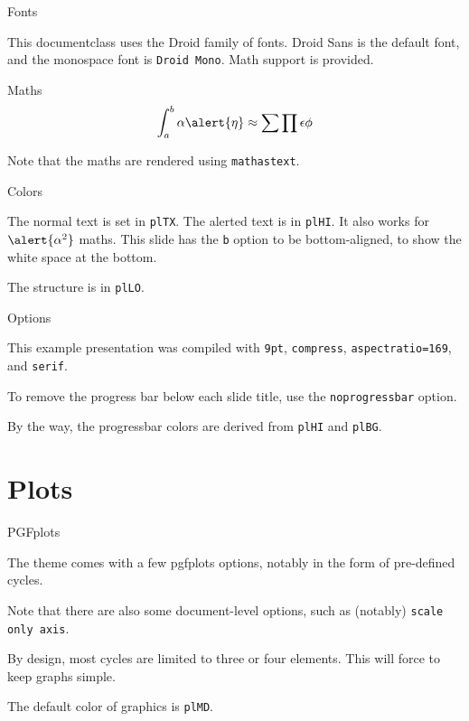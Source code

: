 \documentclass[9pt, compress, aspectratio=169, serif]{beamer}
\begin{document}
\begin{frame}{Fonts}

    This documentclass uses the Droid family of fonts. {\sffamily Droid Sans is
    the default font}, and the monospace font is \texttt{Droid Mono}. Math
    support is provided.

\end{frame}

\begin{frame}{Maths}
  $$\int_a^b \alpha \alert{\eta} \approx \sum \prod \epsilon \phi$$

    Note that the maths are rendered using \texttt{mathastext}.

\end{frame}

\begin{frame}[b]{Colors}

  The normal text is set in \texttt{plTX}. The \alert{alerted text} is in
  \texttt{plHI}. It also works for $\alert{\alpha^2}$ maths. This slide has the
  \texttt{b} option to be bottom-aligned, to show the white space at the bottom.

  The structure is in \texttt{plLO}.

\end{frame}

\begin{frame}[t]{Options}

  This example presentation was compiled with \texttt{9pt}, \texttt{compress},
  \texttt{aspectratio=169}, and \texttt{serif}.

  To remove the progress bar below each slide title, use the
  \texttt{noprogressbar} option.

  By the way, the progressbar colors are derived from \texttt{plHI} and
  \texttt{plBG}.

\end{frame}

\section{Plots}

\begin{frame}{PGFplots}

  The theme comes with a few pgfplots options, notably in the form of
  pre-defined cycles.

  Note that there are also some document-level options, such as (notably)
  \texttt{scale only axis}.

  \alert{By design}, most cycles are limited to three or four elements. This
  will force to keep graphs simple.

  The default color of graphics is {\color{plMD}\texttt{plMD}}.

\end{frame}
\end{document}
